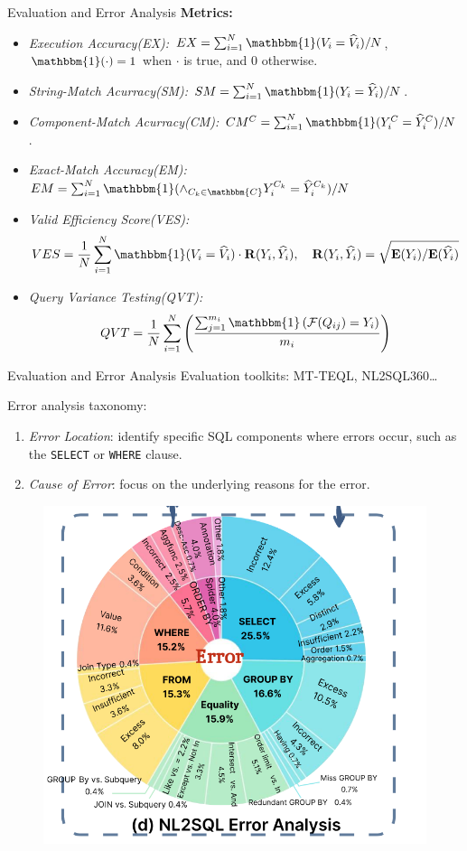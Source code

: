\documentclass[aspectratio=169,xcolor=dvipsnames]{beamer}
\begin{document}

\begin{frame}{Evaluation and Error Analysis}
    \textbf{Metrics: }
    \begin{itemize}
        \item \textit{Execution Accuracy(EX):} $EX=\sum_{i=1}^N \mathbbm{1}(V_i=\widehat{V}_i) / N$, $\mathbbm{1}(\cdot)=1$ when $\cdot$ is true, and $0$ otherwise.
        \item \textit{String-Match Acurracy(SM):} $SM=\sum_{i=1}^N \mathbbm{1}(Y_i=\widehat{Y}_i) / N$.
        \item \textit{Component-Match Acurracy(CM):} $CM^C=\sum_{i=1}^N \mathbbm{1}(Y_i^C=\widehat{Y}_i^C) / N$.
        \item \textit{Exact-Match Accuracy(EM):}$EM=\sum_{i=1}^N \mathbbm{1}(\land_{C_k\in \mathbbm{C}} Y_i^{C_k}=\widehat{Y}_i^{C_k}) / N$
        \item \textit{Valid Efficiency Score(VES):}
        \[
            VES=\frac{1}{N}\sum_{i=1}^N \mathbbm{1}(V_i=\widehat{V}_i)\cdot \mathbf{R}(Y_i, \widehat{Y_i}),\quad \mathbf{R}(Y_i, \widehat{Y_i}) =\sqrt{\mathbf{E}(Y_i)/\mathbf{E}(\widehat{Y_i})}
        \]
        \item \textit{Query Variance Testing(QVT):}
        \[
            QVT=\frac{1}{N}\sum_{i=1}^N \left(\frac{\sum_{j=1}^{m_i}\mathbbm{1}\left(\mathcal{F} (Q_{ij})=Y_i\right)}{m_i}\right)
        \]
    \end{itemize}
\end{frame}

\begin{frame}{Evaluation and Error Analysis}
    Evaluation toolkits: MT-TEQL, NL2SQL360\dots

    Error analysis taxonomy:
    \begin{enumerate}
        \item \textit{Error Location}: identify specific SQL components where errors occur, such as the \texttt{SELECT} or \texttt{WHERE} clause.
        \item \textit{Cause of Error}: focus on the underlying reasons for the error.
    \end{enumerate}
    \begin{figure}
        \includegraphics[width=.35\linewidth]{assets/error.png}
    \end{figure}
\end{frame}
\end{document}
